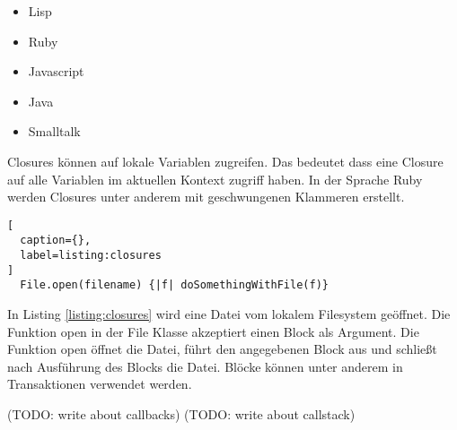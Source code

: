 \begin{itemize}
  \item Lisp
  \item Ruby
  \item Javascript
  \item Java
  \item Smalltalk
\end{itemize}

Closures können auf lokale Variablen zugreifen. Das bedeutet dass eine Closure auf alle Variablen im aktuellen Kontext zugriff haben. In der Sprache Ruby werden Closures unter anderem mit geschwungenen Klammeren erstellt. \cite[]{fow04}

\begin{lstlisting}[
  caption={},
  label=listing:closures
]
  File.open(filename) {|f| doSomethingWithFile(f)}
\end{lstlisting}
\cite[]{fow04}

In Listing \ref{listing:closures} wird eine Datei vom lokalem Filesystem geöffnet. Die Funktion open in der File Klasse akzeptiert einen Block als Argument. Die Funktion open öffnet die Datei, führt den angegebenen Block aus und schließt nach Ausführung des Blocks die Datei. Blöcke können unter anderem in Transaktionen verwendet werden. \cite[]{fow04}


(TODO: write about callbacks)
(TODO: write about callstack)